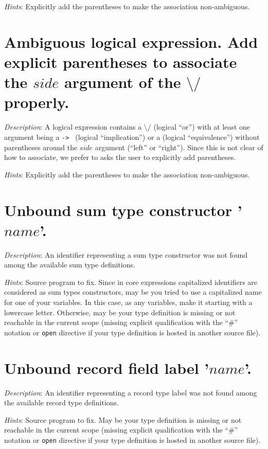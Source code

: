 {\em Hints}: Explicitly add the parentheses to make the association
non-ambiguous.



\section*{Ambiguous logical expression. Add explicit parentheses to
  associate the $side$ argument of the {\tt $\setminus/$} properly.}
{\em Description}: A logical expression contains a
{\tt $\setminus/$} (logical ``or'') with at least one argument being a
{\tt -> } (logical ``implication'') or a {\tt <->} (logical
``equivalence'') without parentheses around the $side$ argument (``left''
or ``right''). Since this is not clear of how to associate, we prefer
to asks the user to explicitly add parentheses.

{\em Hints}: Explicitly add the parentheses to make the association
non-ambiguous.



\section*{Unbound sum type constructor '$name$'.}
{\em Description}: An identifier representing a sum type constructor
was not found among the available sum type definitions.

{\em Hints}: Source program to fix. Since in core expressions
capitalized identifiers are considered as sum types constructors, may
be you tried to use a capitalized name for one of your variables. In
this case, as any variables, make it starting with a lowercase
letter. Otherwise, may be your type definition is missing or not
reachable in the current scope (missing explicit qualification with
the ``\#'' notation or {\tt open} directive if your type definition is
hosted in another source file).



\section*{Unbound record field label '$name$'.}
{\em Description}: An identifier representing a record type label
was not found among the available record type definitions.

{\em Hints}: Source program to fix. May be your type definition is
missing or not reachable in the current scope (missing explicit
qualification with the ``\#'' notation or {\tt open} directive if your
type definition is hosted in another source file).



